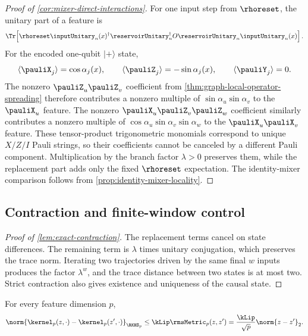 \begin{proof}[Proof of \cref{cor:mixer-direct-interactions}]
For one input step from $\rhoreset$, the unitary part of a feature is
\[
    \Tr\!\left[
      \rhoreset\inputUnitary_n(x)^\dagger
      \reservoirUnitary_n^\dagger O\reservoirUnitary_n
      \inputUnitary_n(x)
    \right].
\]
For the encoded one-qubit $|+\rangle$ state,
\[
    \langle\pauliX_j\rangle=\cos\alpha_j(x),\qquad
    \langle\pauliZ_j\rangle=-\sin\alpha_j(x),\qquad
    \langle\pauliY_j\rangle=0.
\]
The nonzero $\pauliZ_u\pauliZ_v$ coefficient from
\cref{thm:graph-local-operator-spreading} therefore contributes a nonzero
multiple of $\sin\alpha_u\sin\alpha_v$ to the $\pauliX_u$ feature.  The
nonzero $\pauliX_u\pauliZ_v\pauliZ_w$ coefficient similarly contributes a
nonzero multiple of
$\cos\alpha_u\sin\alpha_v\sin\alpha_w$ to the
$\pauliX_u\pauliX_v$ feature.  These tensor-product trigonometric monomials
correspond to unique $X/Z/I$ Pauli strings, so their coefficients cannot be
canceled by a different Pauli component.  Multiplication by the branch factor
$\lambda>0$ preserves them, while the replacement part adds only the fixed
$\rhoreset$ expectation.  The identity-mixer comparison follows from
\cref{prop:identity-mixer-locality}.
\end{proof}

\subsection{Contraction and finite-window control}

\begin{proof}[Proof of \cref{lem:exact-contraction}]
The replacement terms cancel on state differences.  The remaining term is
$\lambda$ times unitary conjugation, which preserves the trace norm.  Iterating
two trajectories driven by the same final $w$ inputs produces the factor
$\lambda^w$, and the trace distance between two states is at most two.  Strict
contraction also gives existence and uniqueness of the causal state.
\end{proof}

\begin{lemma}
\label{lem:matern-section-stability}
For every feature dimension $p$,
\begin{equation}
    \norm{\kernel_p(z,\cdot)-\kernel_p(z',\cdot)}_{\RKHS_p}
    \leq\kLip\rmsMetric_p(z,z')
    =\frac{\kLip}{\sqrt p}\norm{z-z'}_2.
    \label{eq:matern-section-stability}
\end{equation}
\end{lemma}

